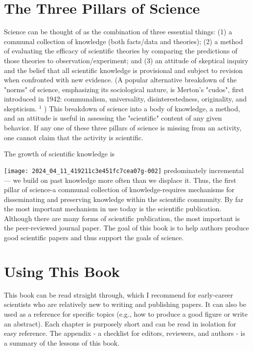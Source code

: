 \section*{The Three Pillars of Science}
Science can be thought of as the combination of three essential things: (1) a communal collection of knowledge (both facts/data and theories); (2) a method of evaluating the efficacy of scientific theories by comparing the predictions of those theories to observation/experiment; and (3) an attitude of skeptical inquiry and the belief that all scientific knowledge is provisional and subject to revision when confronted with new evidence. (A popular alternative breakdown of the "norms" of science, emphasizing its sociological nature, is Merton's "cudos", first introduced in 1942: communalism, universality, disinterestedness, originality, and skepticism. ${ }^{1}$ ) This breakdown of science into a body of knowledge, a method, and an attitude is useful in assessing the "scientific" content of any given behavior. If any one of these three pillars of science is missing from an activity, one cannot claim that the activity is scientific.

The growth of scientific knowledge is

\texttt{[image: 2024\_04\_11\_419211c3e451fc7cea07g-002]}
predominately incremental — we build on past knowledge more often than we displace it. Thus, the first pillar of science-a communal collection of knowledge-requires mechanisms for disseminating and preserving knowledge within the scientific community. By far the most important mechanism in use today is the scientific publication. Although there are many forms of scientific publication, the most important is the peer-reviewed journal paper. The goal of this book is to help authors produce good scientific papers and thus support the goals of science.

\section*{Using This Book}
This book can be read straight through, which I recommend for early-career scientists who are relatively new to writing and publishing papers. It can also be used as a reference for specific topics (e.g., how to produce a good figure or write an abstract). Each chapter is purposely short and can be read in isolation for easy reference. The appendix - a checklist for editors, reviewers, and authors - is a summary of the lessons of this book.

